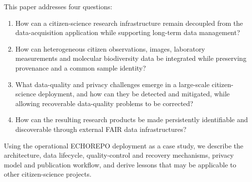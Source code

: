 This paper addresses four questions:

\begin{enumerate}
    \item How can a citizen-science research infrastructure remain
    decoupled from the data-acquisition application while supporting
    long-term data management?

    \item How can heterogeneous citizen observations, images, laboratory
    measurements and molecular biodiversity data be integrated while
    preserving provenance and a common sample identity?

    \item What data-quality and privacy challenges emerge in a large-scale
citizen-science deployment, and how can they be detected and mitigated,
while allowing recoverable data-quality problems to be corrected?

    \item How can the resulting research products be made persistently
    identifiable and discoverable through external FAIR data
    infrastructures?
\end{enumerate}

Using the operational ECHOREPO deployment as a case study, we describe the architecture, data lifecycle, quality-control and recovery mechanisms, privacy model and publication workflow, and derive lessons that may be applicable to other citizen-science projects.
